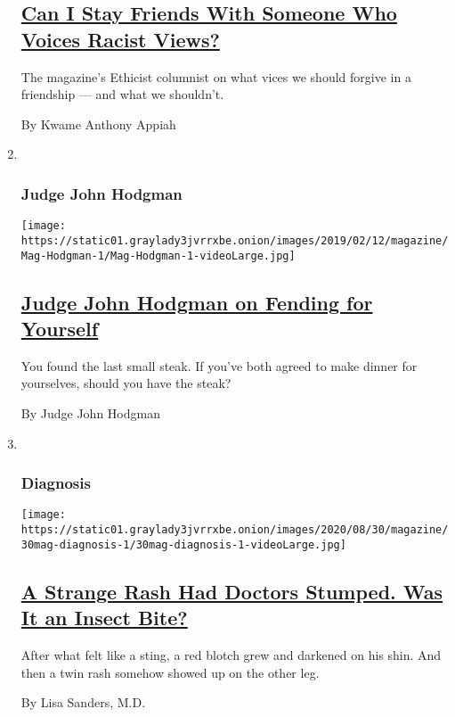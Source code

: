 \begin{enumerate}
  \hypertarget{can-i-stay-friends-with-someone-who-voices-racist-views}{%
  \subsection{\texorpdfstring{\href{/2020/08/25/magazine/can-i-stay-friends-with-someone-who-voices-racist-views.html}{Can
  I Stay Friends With Someone Who Voices Racist
  Views?}}{Can I Stay Friends With Someone Who Voices Racist Views?}}\label{can-i-stay-friends-with-someone-who-voices-racist-views}}

  The magazine's Ethicist columnist on what vices we should forgive in a
  friendship --- and what we shouldn't.

  By Kwame Anthony Appiah
\item ~
  \hypertarget{judge-john-hodgman}{%
  \subsubsection{Judge John Hodgman}\label{judge-john-hodgman}}

  \texttt{[image: https://static01.graylady3jvrrxbe.onion/images/2019/02/12/magazine/Mag-Hodgman-1/Mag-Hodgman-1-videoLarge.jpg]}

  \hypertarget{judge-john-hodgman-on-fending-for-yourself}{%
  \subsection{\texorpdfstring{\href{/2020/08/27/magazine/judge-john-hodgman-on-fending-for-yourself.html}{Judge
  John Hodgman on Fending for
  Yourself}}{Judge John Hodgman on Fending for Yourself}}\label{judge-john-hodgman-on-fending-for-yourself}}

  You found the last small steak. If you've both agreed to make dinner
  for yourselves, should you have the steak?

  By Judge John Hodgman
\item ~
  \hypertarget{diagnosis}{%
  \subsubsection{Diagnosis}\label{diagnosis}}

  \texttt{[image: https://static01.graylady3jvrrxbe.onion/images/2020/08/30/magazine/30mag-diagnosis-1/30mag-diagnosis-1-videoLarge.jpg]}

  \hypertarget{a-strange-rash-had-doctors-stumped-was-it-an-insect-bite}{%
  \subsection{\texorpdfstring{\href{/2020/08/27/magazine/allergic-contact-dermatitis-acd.html}{A
  Strange Rash Had Doctors Stumped. Was It an Insect
  Bite?}}{A Strange Rash Had Doctors Stumped. Was It an Insect Bite?}}\label{a-strange-rash-had-doctors-stumped-was-it-an-insect-bite}}

  After what felt like a sting, a red blotch grew and darkened on his
  shin. And then a twin rash somehow showed up on the other leg.

  By Lisa Sanders, M.D.
\end{enumerate}

